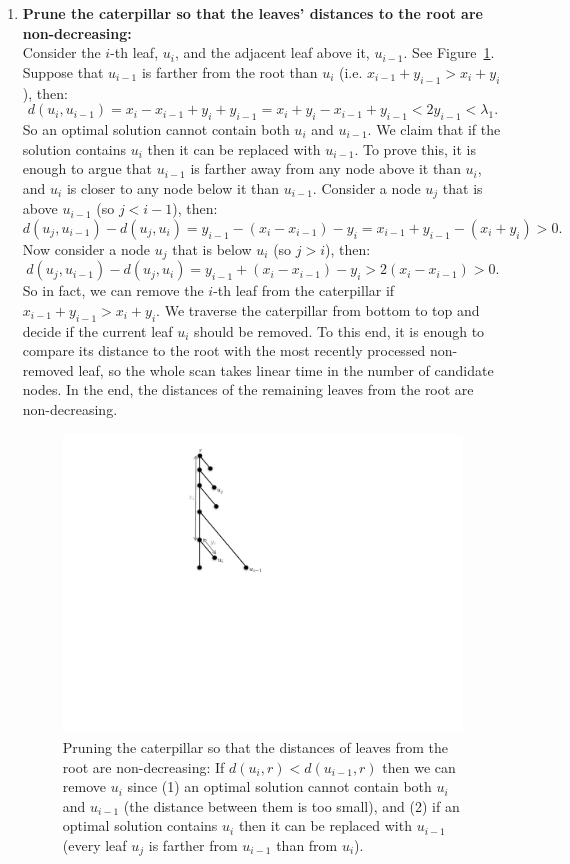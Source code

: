 \documentclass[11pt,a4paper]{article}
\theoremstyle{definition}
\theoremstyle{remark}
\begin{document}
\begin{enumerate}
\item\label{making distances from the root monotone}
\textbf{Prune the caterpillar so that the leaves' distances to the root are non-decreasing:}\\
Consider the $i$-th leaf, $u_i$, and the adjacent leaf above it, $u_{i-1}$. See Figure~\ref{fig:pruning}. Suppose that $u_{i-1}$ is farther from the root than $u_i$ (i.e. $x_{i-1}+y_{i-1} > x_i+y_i$), then:
$$ d(u_{i},u_{i-1}) = x_i-x_{i-1}+y_i+y_{i-1} = x_{i} + y_{i} - x_{i-1} + y_{i-1} < 2y_{i-1} < \lambda_1.$$
So an optimal solution cannot contain both $u_{i}$ and $u_{i-1}$. We claim that if the solution contains
$u_{i}$ then it can be replaced with $u_{i-1}$. To prove this, it is enough to argue that
$u_{i-1}$ is farther away from any node above it than $u_i$, and $u_i$ is closer to any node below it than $u_{i-1}$.
Consider a node $u_{j}$ that is above $u_{i-1}$ (so $j<i-1$), then:
$$d(u_j,u_{i-1}) - d(u_j,u_{i}) = y_{i-1}-(x_i-x_{i-1})-y_i = x_{i-1}+y_{i-1}-(x_i+y_i) > 0.$$
Now consider a node $u_{j}$ that is below $u_{i}$ (so $j>i$), then:
$$d(u_j,u_{i-1}) - d(u_j,u_{i}) = y_{i-1}+(x_i-x_{i-1})-y_i > 2(x_i-x_{i-1}) > 0.$$
So in fact, we can remove the $i$-th leaf from the caterpillar if $x_{i-1}+y_{i-1} > x_i+y_i$. 
We traverse the caterpillar from bottom to top and decide if the current leaf $u_{i}$ should be removed.
To this end, it is enough to compare its distance to the root with the most recently processed non-removed leaf,
so the whole scan takes linear time in the number of candidate nodes. In the end, the distances of the
remaining leaves from the root are non-decreasing.

\begin{figure}
\begin{center}
\includegraphics[scale=0.5]{caterpillar}
\end{center}
\caption{Pruning the caterpillar so that the distances of leaves from the root are non-decreasing: If $d(u_i,r)<d(u_{i-1},r)$ then  we can remove $u_{i}$ since (1) an optimal solution cannot contain both $u_{i}$ and $u_{i-1}$ (the distance between them is too small), and (2) if an optimal solution contains $u_{i}$ then it can be replaced with $u_{i-1}$ (every leaf $u_j$ is farther from $u_{i-1}$ than from $u_i$). \label{fig:pruning}}
\end{figure}


\end{enumerate}
\end{document}
